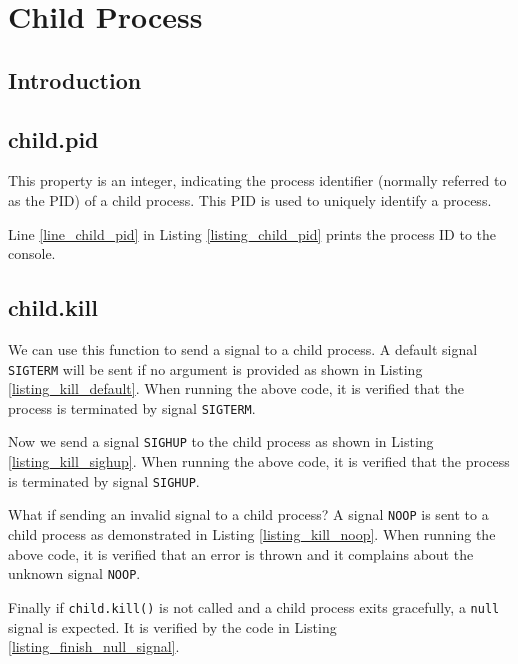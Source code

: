 
\chapter{Child Process}

\section{Introduction}
\section{child.pid}
This property is an integer, indicating the process identifier (normally referred to as the PID) of a child process. This PID is used to uniquely identify a process.

Line \ref{line_child_pid} in Listing \ref{listing_child_pid} prints the process ID to the console.
\section{child.kill}
We can use this function to send a signal to a child process. A default signal \texttt{SIGTERM} will be sent if no argument is provided as shown in Listing \ref{listing_kill_default}.
When running the above code, it is verified that the process is terminated by signal \texttt{SIGTERM}.


Now we send a signal \texttt{SIGHUP} to the child process as shown in Listing \ref{listing_kill_sighup}. When running the above code, it is verified that the process is terminated by signal \texttt{SIGHUP}.


What if sending an invalid signal to a child process? A signal \texttt{NOOP} is sent to a child process as demonstrated in Listing \ref{listing_kill_noop}. When running the above code, it is verified that an error is thrown and it complains about the unknown signal \texttt{NOOP}.

Finally if \texttt{child.kill()} is not called and a child process exits gracefully, a \texttt{null} signal is expected. It is verified by the code in Listing \ref{listing_finish_null_signal}. 
